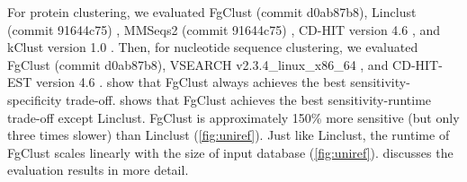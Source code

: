 \documentclass{bioinfo}
\begin{document}
For protein clustering,
we evaluated FgClust (commit d0ab87b8),
Linclust (commit 91644c75) \citep{steinegger2017linclust}, 
MMSeqs2 (commit 91644c75) \citep{steinegger2017mmseqs2}, 
CD-HIT version 4.6 \citep{fu2012cd},
and kClust version 1.0 \citep{hauser2013kclust}.
Then, for nucleotide sequence clustering, we evaluated FgClust
(commit d0ab87b8),
VSEARCH v2.3.4\_linux\_x86\_64 \citep{rognes2016vsearch}, and CD-HIT-EST version 4.6 \citep{fu2012cd}.%
 show that FgClust always achieves the best sensitivity-specificity trade-off.  shows that FgClust achieves the best sensitivity-runtime trade-off except Linclust. FgClust is approximately 150\% more sensitive (but only three times slower) than Linclust (\cref{fig:uniref}). Just like Linclust, the runtime of FgClust scales linearly with the size of input database (\cref{fig:uniref}).
 discusses the evaluation results in more detail. %
\end{document}
